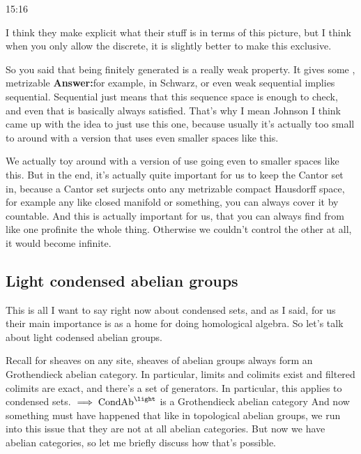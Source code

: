 \begin{unfinished}{15:16}
\begin{example}
\begin{remark}
\begin{remark}
I think they make explicit what their stuff is in terms of this picture, but I think when you only allow the discrete, it is slightly better to make this exclusive.

So you said that being finitely generated is a really weak property. It gives some , 
metrizable
\textbf{Answer:}for example, in Schwarz, or even weak sequential implies sequential. Sequential just means that this sequence space is enough to check, and even that is basically always satisfied. That's why I mean Johnson I think came up with the idea to just use this one, because usually it's actually too small to around with a version that uses even smaller spaces like this.

We actually toy around with a version of use going even to smaller spaces like this. But in the end, it's actually quite important for us to keep the Cantor set in, because a Cantor set surjects onto any metrizable compact Hausdorff space, for example any like closed manifold or something, you can always cover it by countable. And this is actually important for us, that you can always find from like one profinite the whole thing. Otherwise we couldn't control the other at all, it would become infinite.

\subsection{Light condensed abelian groups} \label{subsec:light_condensed_abelian_groups}

This is all I want to say right now about condensed sets, and as I said, for us their main importance is as a home for doing homological algebra. So let's talk about light codensed abelian groups.

Recall for sheaves on any site, sheaves of abelian groups always form an Grothendieck abelian category. In particular, limits and colimits exist and filtered colimits are exact, and there's a set of generators. 
In particular, this applies to condensed sets.
$\implies \Cond\Ab^\light$ is a Grothendieck abelian category
And now something must have happened that like in topological abelian groups, we run into this issue that they are not at all abelian categories. But now we have abelian categories, so let me briefly discuss how that's possible.


\end{remark}
\end{remark}
\end{example}
\end{unfinished}

